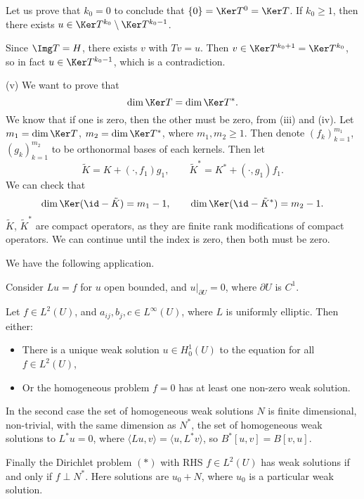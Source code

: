 \documentclass[12pt]{article}
\begin{document}
\begin{proofbox}
	Let us prove that $k_0 = 0$ to conclude that $\{0\} = \Ker T^{0} = \Ker T$. If $k_0 \geq 1$, then there exists $u \in \Ker T^{k_0} \setminus \Ker T^{k_0 - 1}$.

	Since $\Img T = H$, there exists $v$ with $Tv = u$. Then $v \in \Ker T^{k_0 + 1} = \Ker T^{k_0}$, so in fact $u \in \Ker T^{k_0 - 1}$, which is a contradiction.

	(v) We want to prove that
	\[
	\dim \Ker T = \dim \Ker T^{\ast}.
	\]
	We know that if one is zero, then the other must be zero, from (iii) and (iv). Let $m_1 = \dim \Ker T$, $m_2 = \dim \Ker T^{\ast}$, where $m_1, m_2 \geq 1$. Then denote $(f_k)_{k = 1}^{m_1}$, $(g_k)_{k = 1}^{m_2}$ to be orthonormal bases of each kernels. Then let
	\[
	\tilde K = K + (\cdot, f_1) g_1, \qquad \tilde K^{\ast} = K^{\ast} + (\cdot, g_1) f_1.
	\]
	We can check that
	\[
	\dim \Ker (\id - \tilde K) = m_1 - 1, \qquad \dim \Ker (\id - \tilde K^{\ast}) = m_2 - 1.
	\]
	$\tilde K$, $\tilde K^{\ast}$ are compact operators, as they are finite rank modifications of compact operators. We can continue until the index is zero, then both must be zero.
\end{proofbox}

We have the following application.

\begin{corollary}
	Consider $Lu = f$ for $u$ open bounded, and $u|_{\partial U} = 0$, where $\partial U$ is $C^1$.

	Let $f \in L^2(U)$, and $a_{ij}, b_j, c \in L^{\infty}(U)$, where $L$ is uniformly elliptic. Then either:
	\begin{itemize}
		\item There is a unique weak solution $u \in H_0^1 (U)$ to the equation for all $f \in L^2(U)$,
		\item Or the homogeneous problem $f = 0$ has at least one non-zero weak solution.
	\end{itemize}
	In the second case the set of homogeneous weak solutions $N$ is finite dimensional, non-trivial, with the same dimension as $N^{\ast}$, the set of homogeneous weak solutions to $L^{\ast} u = 0$, where $\langle Lu, v\rangle = \langle u, L^{\ast} v\rangle$, so $B^{\ast}[u, v] = B[v, u]$.

	Finally the Dirichlet problem $(\ast)$ with RHS $f \in L^2(U)$ has weak solutions if and only if $f \perp N^{\ast}$. Here solutions are $u_0 + N$, where $u_0$ is a particular weak solution.
\end{corollary}
\end{document}
